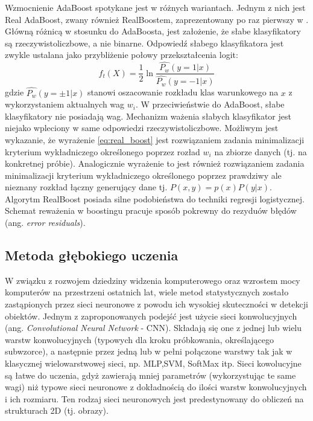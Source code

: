 Wzmocnienie AdaBoost spotykane jest w różnych wariantach.
Jednym z nich jest Real AdaBoost, zwany również RealBoostem, zaprezentowany po raz pierwszy w \cite{10.1023/A:1007614523901}.
Główną różnicą w stosunku do AdaBoosta, jest założenie, że słabe klasyfikatory są rzeczywistoliczbowe, a nie binarne.
Odpowiedź słabego klasyfikatora jest zwykle ustalana jako przybliżenie połowy przekształcenia logit:
\begin{equation}
    \label{eq:real_boost}
    f_t(X) =\dfrac{1}{2}\ln\dfrac{\hat{P_w}(y=1|x)}{\hat{P_w}(y=-1|x)}
\end{equation}
gdzie $\hat{P_w}(y=\pm1|x)$ stanowi oszacowanie rozkładu klas warunkowego na $x$ z wykorzystaniem aktualnych wag $w_i$.
W przeciwieństwie do AdaBoost, słabe klasyfikatory nie posiadają wag.
Mechanizm ważenia słabych klasyfikator jest niejako wpleciony w same odpowiedzi rzeczywistoliczbowe.
Możliwym jest wykazanie, że wyrażenie \ref{eq:real_boost} jest rozwiązaniem zadania minimalizacji kryterium wykładniczego określonego poprzez rozład ${w_i}$ na zbiorze danych (tj. na konkretnej próbie).
Analogicznie wyrażenie to jest również rozwiązaniem zadania minimalizacji kryterium wykładniczego określonego poprzez prawdziwy ale nieznany rozkład łączny generujący dane tj. $P(x,y)=p(x)P(y|x)$.
Algorytm RealBoost posiada silne podobieństwa do techniki regresji logistycznej.
Schemat reważenia w boostingu pracuje sposób pokrewny do rezyduów błędów (ang. \textit{error residuals}).

\subsection{Metoda głębokiego uczenia}
W związku z rozwojem dziedziny widzenia komputerowego oraz wzrostem mocy komputerów na przestrzeni ostatnich lat, wiele metod statystycznych zostało zastąpionych przez sieci neuronowe z powodu ich wysokiej skuteczności w detekcji obiektów.
Jednym z zaproponowanych podejść jest użycie sieci konwolucyjnych (ang. \textit{Convolutional Neural Network} - CNN)\cite{cnn_detector}.
Składają się one z jednej lub wielu warstw konwolucyjnych (typowych dla kroku próbkowania, określającego subwzorce), a następnie przez jedną lub w pełni połączone warstwy tak jak w klasycznej wielowarstwowej sieci, np. MLP,SVM, SoftMax itp.
Sieci kowolucyjne są łatwe do uczenia, gdyż zawierają mniej parametrów (wykorzystując te same wagi) niż typowe sieci neuronowe z dokładnością do ilości warstw konwolucyjnych i ich rozmiaru.
Ten rodzaj sieci neuronowych jest predestynowany do obliczeń na strukturach 2D (tj. obrazy).

